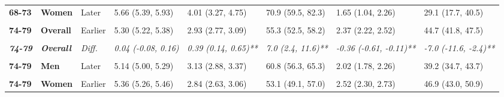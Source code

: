 \begin{table}[!h]
{{\begin{tabular}[t]{>{}l>{}lllllll}
\cmidrule{1-8}
\textbf{68-73} & \textbf{Women} & Later & 5.66 (5.39, 5.93) & 4.01 (3.27, 4.75) & 70.9 (59.5, 82.3) & 1.65 (1.04, 2.26) & 29.1 (17.7, 40.5)\\
\cmidrule{1-8}
\em{\textbf{\cellcolor{gray!10}{68-73}}} & \em{\textbf{\cellcolor{gray!10}{Women}}} & \em{\cellcolor{gray!10}{Diff.}} & \em{\cellcolor{gray!10}{0.06 (-0.22, 0.34)}} & \em{\cellcolor{gray!10}{0.90 (0.12, 1.68)*}} & \em{\cellcolor{gray!10}{15.3 (3.2, 27.4)*}} & \em{\cellcolor{gray!10}{-0.84 (-1.50, -0.18)*}} & \em{\cellcolor{gray!10}{-15.3 (-27.4, -3.2)*}}\\
\cmidrule{1-8}
\textbf{74-79} & \textbf{Overall} & Earlier & 5.30 (5.22, 5.38) & 2.93 (2.77, 3.09) & 55.3 (52.5, 58.2) & 2.37 (2.22, 2.52) & 44.7 (41.8, 47.5)\\
\cmidrule{1-8}
\textbf{\cellcolor{gray!10}{74-79}} & \textbf{\cellcolor{gray!10}{Overall}} & \cellcolor{gray!10}{Later} & \cellcolor{gray!10}{5.33 (5.24, 5.43)} & \cellcolor{gray!10}{3.32 (3.12, 3.52)} & \cellcolor{gray!10}{62.3 (58.7, 65.9)} & \cellcolor{gray!10}{2.01 (1.81, 2.21)} & \cellcolor{gray!10}{37.7 (34.1, 41.3)}\\
\cmidrule{1-8}
\em{\textbf{74-79}} & \em{\textbf{Overall}} & \em{Diff.} & \em{0.04 (-0.08, 0.16)} & \em{0.39 (0.14, 0.65)**} & \em{7.0 (2.4, 11.6)**} & \em{-0.36 (-0.61, -0.11)**} & \em{-7.0 (-11.6, -2.4)**}\\
\cmidrule{1-8}
\textbf{\cellcolor{gray!10}{74-79}} & \textbf{\cellcolor{gray!10}{Men}} & \cellcolor{gray!10}{Earlier} & \cellcolor{gray!10}{5.23 (5.12, 5.34)} & \cellcolor{gray!10}{3.03 (2.82, 3.24)} & \cellcolor{gray!10}{57.9 (54.2, 61.6)} & \cellcolor{gray!10}{2.20 (2.01, 2.40)} & \cellcolor{gray!10}{42.1 (38.4, 45.8)}\\
\cmidrule{1-8}
\textbf{74-79} & \textbf{Men} & Later & 5.14 (5.00, 5.29) & 3.13 (2.88, 3.37) & 60.8 (56.3, 65.3) & 2.02 (1.78, 2.26) & 39.2 (34.7, 43.7)\\
\cmidrule{1-8}
\em{\textbf{\cellcolor{gray!10}{74-79}}} & \em{\textbf{\cellcolor{gray!10}{Men}}} & \em{\cellcolor{gray!10}{Diff.}} & \em{\cellcolor{gray!10}{-0.08 (-0.26, 0.09)}} & \em{\cellcolor{gray!10}{0.10 (-0.22, 0.42)}} & \em{\cellcolor{gray!10}{2.9 (-3.0, 8.7)}} & \em{\cellcolor{gray!10}{-0.18 (-0.49, 0.13)}} & \em{\cellcolor{gray!10}{-2.9 (-8.7, 3.0)}}\\
\cmidrule{1-8}
\textbf{74-79} & \textbf{Women} & Earlier & 5.36 (5.26, 5.46) & 2.84 (2.63, 3.06) & 53.1 (49.1, 57.0) & 2.52 (2.30, 2.73) & 46.9 (43.0, 50.9)\\
\cmidrule{1-8}

\end{tabular}}}
\end{table}
